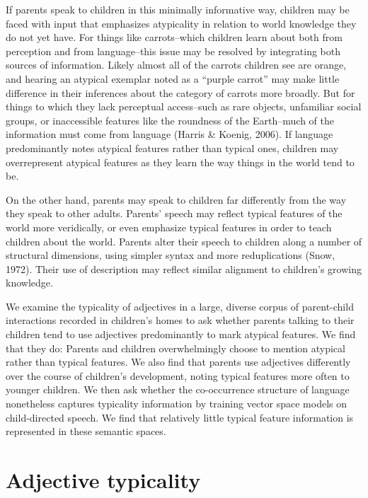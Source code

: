 \documentclass[10pt, letterpaper]{article}
\begin{document}
If parents speak to children in this minimally informative way, children
may be faced with input that emphasizes atypicality in relation to world
knowledge they do not yet have. For things like carrots--which children
learn about both from perception and from language--this issue may be
resolved by integrating both sources of information. Likely almost all
of the carrots children see are orange, and hearing an atypical exemplar
noted as a ``purple carrot'' may make little difference in their
inferences about the category of carrots more broadly. But for things to
which they lack perceptual access--such as rare objects, unfamiliar
social groups, or inaccessible features like the roundness of the
Earth--much of the information must come from language (Harris \&
Koenig, 2006). If language predominantly notes atypical features rather
than typical ones, children may overrepresent atypical features as they
learn the way things in the world tend to be.

On the other hand, parents may speak to children far differently from
the way they speak to other adults. Parents' speech may reflect typical
features of the world more veridically, or even emphasize typical
features in order to teach children about the world. Parents alter their
speech to children along a number of structural dimensions, using
simpler syntax and more reduplications (Snow, 1972). Their use of
description may reflect similar alignment to children's growing
knowledge.

We examine the typicality of adjectives in a large, diverse corpus of
parent-child interactions recorded in children's homes to ask whether
parents talking to their children tend to use adjectives predominantly
to mark atypical features. We find that they do: Parents and children
overwhelmingly choose to mention atypical rather than typical features.
We also find that parents use adjectives differently over the course of
children's development, noting typical features more often to younger
children. We then ask whether the co-occurrence structure of language
nonetheless captures typicality information by training vector space
models on child-directed speech. We find that relatively little typical
feature information is represented in these semantic spaces.

\hypertarget{adjective-typicality}{%
\section{Adjective typicality}\label{adjective-typicality}}
\end{document}
